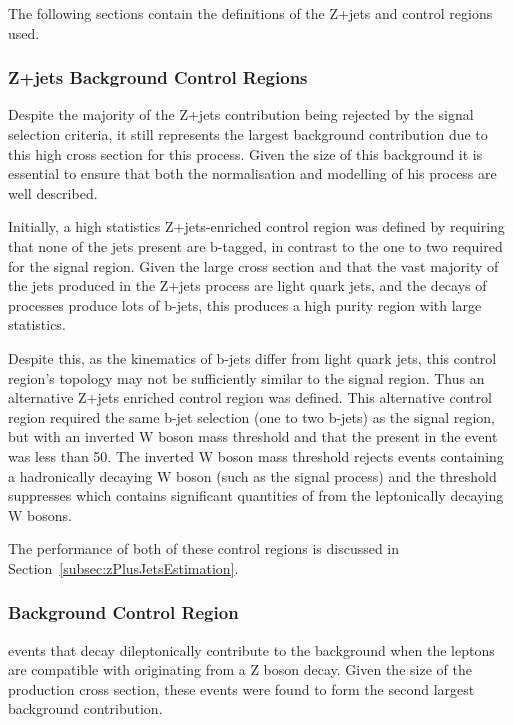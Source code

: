 The following sections contain the definitions of the Z+jets and \ttbar control regions used.

\subsubsection{Z+jets Background Control Regions}\label{subsec:zPlusJetsCR}
Despite the majority of the Z+jets contribution being rejected by the signal selection criteria, it still represents the largest background contribution due to this high cross section for this process.
Given the size of this background it is essential to ensure that both the normalisation and modelling of his process are well described.

Initially, a high statistics Z+jets-enriched control region was defined by requiring that none of the jets present are b-tagged, in contrast to the one to two required for the signal region.
Given the large cross section and that the vast majority of the jets produced in the Z+jets process are light quark jets, and the decays of \ttbar processes produce lots of b-jets, this produces a high purity region with large statistics.

Despite this, as the kinematics of b-jets differ from light quark jets, this control region's topology may not be sufficiently similar to the signal region.
Thus an alternative Z+jets enriched control region was defined.
This alternative control region required the same b-jet selection (one to two b-jets) as the signal region, but with an inverted W boson mass threshold and that the \MET present in the event was less than 50\GeV.
The inverted W boson mass threshold rejects events containing a hadronically decaying W boson (such as the signal process) and the \MET threshold suppresses \ttbar which contains significant quantities of \MET from the leptonically decaying W bosons.

The performance of both of these control regions is discussed in Section~\ref{subsec:zPlusJetsEstimation}.

\subsubsection{\ttbar Background Control Region}\label{subsec:ttbarCR}
\ttbar events that decay dileptonically contribute to the background when the leptons are compatible with originating from a Z boson decay.
Given the size of the \ttbar production cross section, these events were found to form the second largest background contribution.

